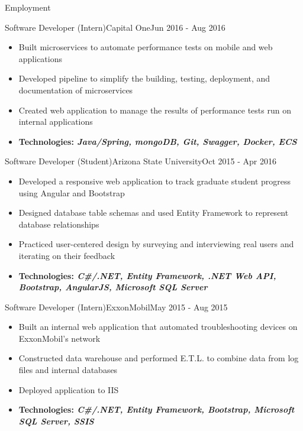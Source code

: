 \documentclass[]{mcdowellcv}
\begin{document}
\begin{cvsection}{Employment}
		\begin{cvsubsection}{Software Developer (Intern)}{Capital One}{Jun 2016 - Aug 2016}
			\begin{itemize}
				\item Built microservices to automate performance tests on mobile and web applications
				\item Developed pipeline to simplify the building, testing, deployment, and documentation of microservices
				\item Created web application to manage the results of performance tests run on internal applications
				\item \textbf{Technologies: \emph{Java/Spring, mongoDB, Git, Swagger, Docker, ECS}}
			\end{itemize}
		\end{cvsubsection}

		\begin{cvsubsection}{Software Developer (Student)}{Arizona State University}{Oct 2015 - Apr 2016}
			\begin{itemize}
				\item Developed a responsive web application to track graduate student progress using Angular and Bootstrap
				\item Designed database table schemas and used Entity Framework to represent database relationships
				\item Practiced user-centered design by surveying and interviewing real users and iterating on their feedback
				\item \textbf{Technologies: \emph{C\#/.NET, Entity Framework, .NET Web API, Bootstrap, AngularJS, Microsoft SQL Server}}
			\end{itemize}
		\end{cvsubsection}

		\begin{cvsubsection}{Software Developer (Intern)}{ExxonMobil}{May 2015 - Aug 2015}
			\begin{itemize}
				\item Built an internal web application that automated troubleshooting devices on ExxonMobil’s network
				\item Constructed data warehouse and performed E.T.L. to combine data from log files and internal databases
				\item Deployed application to IIS
				\item \textbf{Technologies: \emph{C\#/.NET, Entity Framework, Bootstrap, Microsoft SQL Server, SSIS}}
			\end{itemize}
		\end{cvsubsection}
	\end{cvsection}
\end{document}
